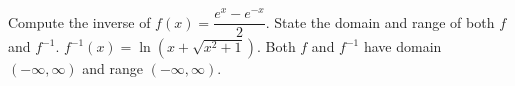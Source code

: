 {\label{hyperbolicsine} Compute the inverse of $f(x) = \dfrac{e^{x} - e^{-x}}{2}$.  State the domain and range of both $f$ and $f^{-1}$. }
{$f^{-1}(x) = \ln\left(x + \sqrt{x^{2} + 1}\right)$. Both $f$ and $f^{-1}$ have domain $(-\infty, \infty)$ and range $(-\infty, \infty)$.}